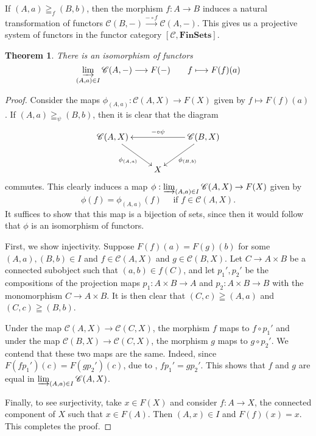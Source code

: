 \documentclass[10pt]{article}
\theoremstyle{thmstyle}
\newtheorem{theorem}{Theorem}[section]
\theoremstyle{defstyle}
\newcommand{\catFinSets}{\mathbf{FinSets}}
\newcommand{\scrC}{\mathscr{C}} %
\begin{document}
If $(A, a)\geqq_f (B, b)$, then the morphism $f: A\to B$ induces a natural transformation of functors $\scrC(B, -)\xrightarrow{-\circ f}\scrC(A, -)$. This gives us a projective system of functors in the functor category $[\scrC,\catFinSets]$. 

\begin{theorem}
    There is an isomorphism of functors 
    \begin{equation*}
        \varinjlim_{(A, a)\in I}\scrC(A, -)\longrightarrow F(-)\qquad f\longmapsto F(f)(a)
    \end{equation*}
\end{theorem}
\begin{proof} %
    Consider the maps $\phi_{(A, a)}: \scrC(A, X)\to F(X)$ given by $f\mapsto F(f)(a)$. If $(A, a)\geqq_\psi (B, b)$, then it is clear that the diagram 
    \begin{equation*}
        \xymatrix {
            \scrC(A, X)\ar[rd]_-{\phi_{(A, a)}} & & \scrC(B, X)\ar[ld]^-{\phi_{(B, b)}}\ar[ll]_{-\circ\psi}\\
            & X &
        }
    \end{equation*}
    commutes. This clearly induces a map $\phi: \varinjlim_{(A, a)\in I}\scrC(A, X)\to F(X)$ given by 
    \begin{equation*}
        \phi(f) = \phi_{(A, a)}(f) \quad\text{ if } f\in\scrC(A, X).
    \end{equation*}
    It suffices to show that this map is a bijection of sets, since then it would follow that $\phi$ is an isomorphism of functors.

    First, we show injectivity. Suppose $F(f)(a) = F(g)(b)$ for some $(A, a), (B, b)\in I$ and $f\in\scrC(A, X)$ and $g\in\scrC(B, X)$. Let $C\to A\times B$ be a connected subobject such that $(a, b)\in f(C)$, and let $p_1', p_2'$ be the compositions of the projection maps $p_1: A\times B\to A$ and $p_2: A\times B\to B$ with the monomorphism $C\to A\times B$. It is then clear that $\left(C, c\right)\geqq(A, a)$ and $\left(C, c\right)\geqq(B, b)$. 

    Under the map $\scrC(A, X)\to\scrC(C, X)$, the morphism $f$ maps to $f\circ p_1'$ and under the map $\scrC(B, X)\to\scrC(C, X)$, the morphism $g$ maps to $g\circ p_2'$. We contend that these two maps are the same. Indeed, since $F(fp_1')(c) = F(gp_2')(c)$, due to , $fp_1' = gp_2'$. This shows that $f$ and $g$ are equal in $\varinjlim_{(A, a)\in I}\scrC(A, X)$.

    Finally, to see surjectivity, take $x\in F(X)$ and consider $f: A\to X$, the connected component of $X$ such that $x\in F(A)$. Then $(A, x)\in I$ and $F(f)(x) = x$. This completes the proof.
\end{proof}
\end{document}
